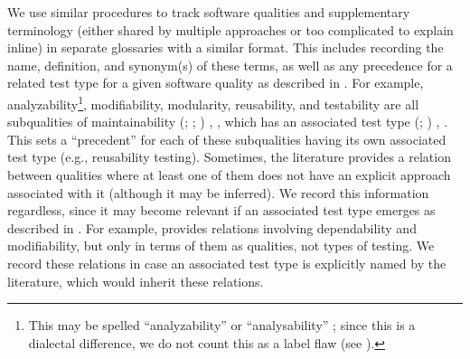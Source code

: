 \label{qual-supp-procedure}
We use similar procedures to track software qualities and supplementary
terminology (either shared by multiple approaches or too complicated to explain
inline) in separate glossaries with a similar format. This includes recording
the name, definition, and synonym(s) of these terms, as well as any precedence
for a related test type for a given software quality as described in
. For example, analyzability\footnote{
    This may be spelled ``analyzability'' \citep[p.~18]{IEEE2017} or
    ``analysability'' \citep{ISO_IEC2023a}; since this is a dialectal
    difference, we do not count this as a label flaw (see
    ).}, modifiability, modularity, reusability, and
testability are all subqualities of maintainability \ifnotpaper
    (\citealp{ISO_IEC2023a}; \citealp[Tab.~A.1]{IEEE2021};
    \citealp[p.~7\=/10]{SWEBOK2024}) \else
    \cite[p.~7\=/10]{SWEBOK2024}, \cite[Tab.~A.1]{IEEE2021},
    \cite{ISO_IEC2023a} \fi which has an associated test type
\ifnotpaper
    (\citealp[pp.~5, 22]{IEEE2022}; \citeyear[p.~38, Tab.~A.1]{IEEE2021})\else
    \cite[pp.~5, 22]{IEEE2022}, \cite[p.~38, Tab.~A.1]{IEEE2021}\fi. This sets
a ``precedent'' for each of these subqualities having its own associated test
type (e.g., reusability testing). \ifnotpaper
    Sometimes, the literature provides a relation between qualities where at
    least one of them does not have an explicit approach associated with it
    (although it may be inferred). We record this information regardless, since
    it may become relevant if an associated test type emerges as described in
    . For example, \citet{ISO_IEC2023a} provides
    relations involving dependability and modifiability, but only in terms of
    them as qualities, not types of testing. We record these relations in case
    an associated test type is explicitly named by the literature, which would
    inherit these relations. \fi

